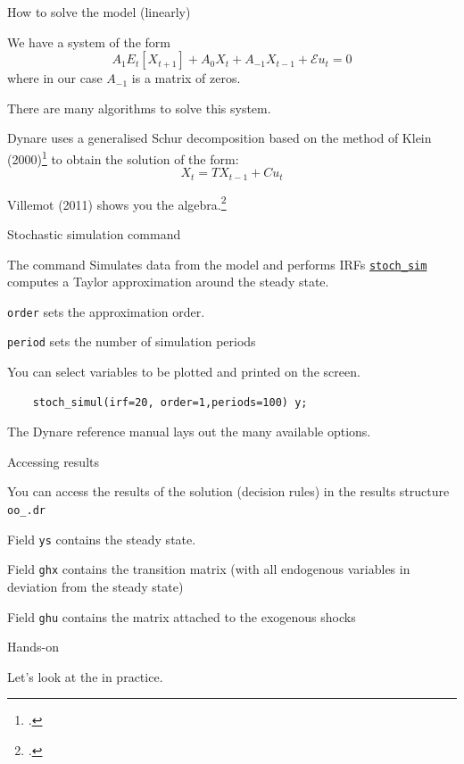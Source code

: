 \begin{frame}{How to solve the model (linearly)}
\begin{wideitemize}
\item We have a system of the form
\begin{equation*}
A_1E_t\left[X_{t+1}\right] + A_0X_t  + A_{-1}X_{t-1} +  \mathcal{E} u_t = 0
\end{equation*}
where in our case $A_{-1}$ is a matrix of zeros.
\item There are many algorithms to solve this system.
\item Dynare uses a generalised Schur decomposition based on the method of Klein (2000)\footcite{klein2000using} to obtain the solution of the form:
\begin{equation*}
    X_{t} = TX_{t-1}+Cu_t
\end{equation*}
\item Villemot (2011) shows you the algebra.\footcite{villemot2011solving}
\end{wideitemize}
\end{frame}


\begin{frame}[fragile]{Stochastic simulation command}
    \begin{wideitemize}
    \item The command  Simulates data from the model and performs IRFs \href{https://www.dynare.org/manual/the-model-file.html?highlight=stoch_sim#stoch_simul}{\texttt{stoch\_sim}}
    computes a Taylor approximation around the steady state.
    \item \texttt{order} sets the approximation order.
    \item \texttt{period} sets the number of simulation periods
    \item You can select variables to be plotted and printed on the screen.
    \begin{verbatim}
    stoch_simul(irf=20, order=1,periods=100) y;
    \end{verbatim}
    \item The Dynare reference manual lays out the many available options.
    \end{wideitemize}
\end{frame}

\begin{frame}{Accessing results}
\begin{wideitemize}
\item You can access the results of the solution (decision rules) in the results structure \texttt{oo\_.dr}
\item Field \texttt{ys} contains the steady state.
\item Field \texttt{ghx} contains the transition matrix (with all endogenous variables in deviation from the steady state)
\item Field \texttt{ghu} contains the matrix attached to the exogenous shocks
\end{wideitemize}
\end{frame}


\begin{frame}{Hands-on}
\begin{wideitemize}
\item Let's look at the  in practice.
\end{wideitemize}
\end{frame} 